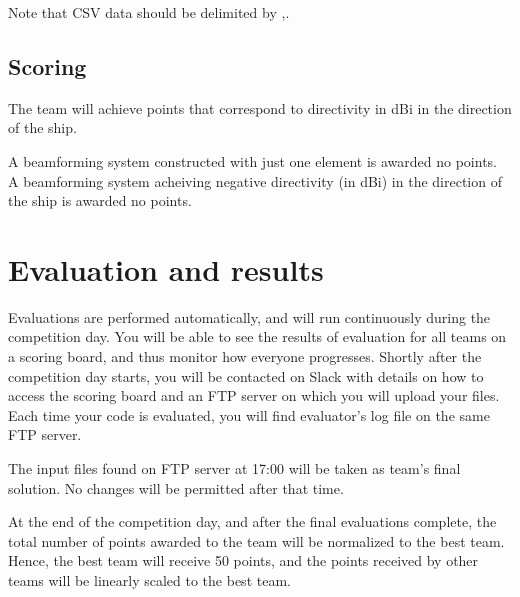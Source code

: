 \documentclass{article}[a4paper]
\begin{document}
Note that CSV data should be delimited by \textsf{,}.

\subsection*{Scoring}

The team will achieve points that correspond to directivity in dBi in the direction of the ship.

A beamforming system constructed with just one element is awarded no points. A beamforming system acheiving negative directivity (in dBi) in the direction of the ship is awarded no points.

\section*{Evaluation and results}

Evaluations are performed automatically, and will run continuously during the competition day. You will be able to see the results of evaluation for all teams on a scoring board, and thus monitor how everyone progresses. Shortly after the competition day starts, you will be contacted on Slack with details on how to access the scoring board and an FTP server on which you will upload your files. Each time your code is evaluated, you will find evaluator's log file on the same FTP server.

The input files found on FTP server at 17:00 will be taken as team's final solution. No changes will be permitted after that time.

At the end of the competition day, and after the final evaluations complete, the total number of points awarded to the team will be normalized to the best team. Hence, the best team will receive 50 points, and the points received by other teams will be linearly scaled to the best team.
\end{document}
